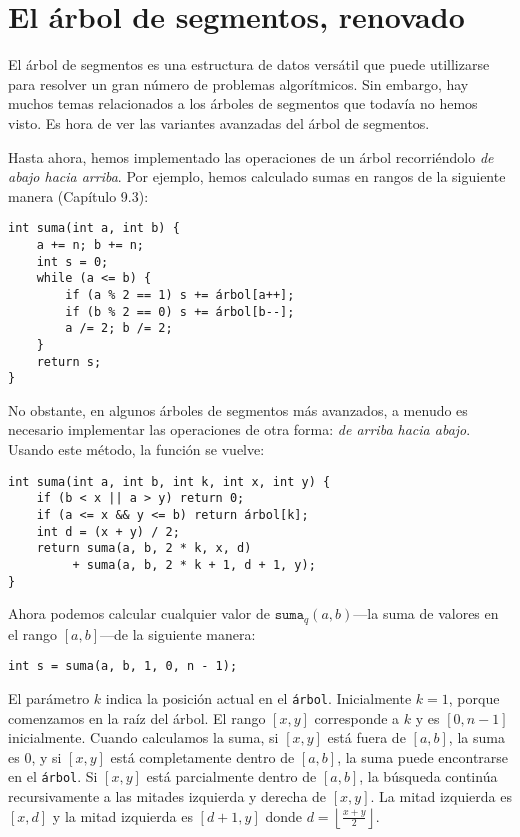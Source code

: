 \chapter{El árbol de segmentos, renovado}


El árbol de segmentos es una estructura de datos versátil que puede
utillizarse para resolver un gran número de problemas algorítmicos. Sin
embargo, hay muchos temas relacionados a los árboles de segmentos que todavía
no hemos visto. Es hora de ver las variantes avanzadas del árbol de
segmentos.

Hasta ahora, hemos implementado las operaciones de un árbol recorriéndolo
\emph{de abajo hacia arriba}. Por ejemplo, hemos calculado sumas en rangos
de la siguiente manera (Capítulo 9.3):

\begin{lstlisting}
int suma(int a, int b) {
    a += n; b += n;
    int s = 0;
    while (a <= b) {
        if (a % 2 == 1) s += árbol[a++];
        if (b % 2 == 0) s += árbol[b--];
        a /= 2; b /= 2;
    }
    return s;
}
\end{lstlisting}

No obstante, en algunos árboles de segmentos más avanzados, a menudo es
necesario implementar las operaciones de otra forma: \emph{de arriba hacia
    abajo}. Usando este método, la función se vuelve:
\begin{lstlisting}
int suma(int a, int b, int k, int x, int y) {
    if (b < x || a > y) return 0;
    if (a <= x && y <= b) return árbol[k];
    int d = (x + y) / 2;
    return suma(a, b, 2 * k, x, d)
         + suma(a, b, 2 * k + 1, d + 1, y);
}
\end{lstlisting}

Ahora podemos calcular cualquier valor de $\texttt{suma}_q(a, b)$---la
suma de valores en el rango $[a,b]$---de la siguiente manera:
\begin{lstlisting}
int s = suma(a, b, 1, 0, n - 1);
\end{lstlisting}

El parámetro $k$ indica la posición actual en el \texttt{árbol}. Inicialmente
$k=1$, porque comenzamos en la raíz del árbol. El rango $[x,y]$ corresponde
a $k$ y es $[0,n-1]$ inicialmente. Cuando calculamos la suma, si $[x,y]$
está fuera de $[a,b]$, la suma es 0, y si $[x,y]$ está completamente dentro
de $[a,b]$, la suma puede encontrarse en el \texttt{árbol}. Si $[x,y]$ está
parcialmente dentro de $[a,b]$, la búsqueda continúa recursivamente a las
mitades izquierda y derecha de $[x,y]$. La mitad izquierda es $[x,d]$ y la
mitad izquierda es $[d+1,y]$ donde $d=\left\lfloor \frac{x+y}{2} \right\rfloor$.

